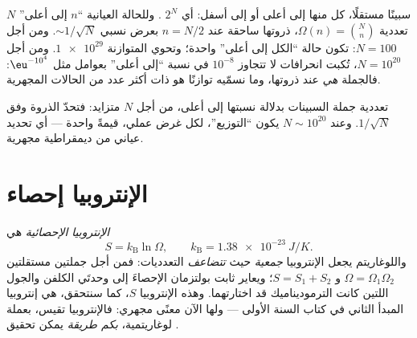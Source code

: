 \begin{example}\label{ex:b3:microcanonical-ensemble:spins}
$N$ سبينًا مستقلًا، كل منها إلى أعلى أو إلى أسفل: أي $2^N$ .
وللحالة العيانية ``$n$ إلى أعلى'' تعددية $\Omega(n) = \binom Nn$،
ذروتها ساحقة عند $n = N/2$ بعرض نسبي
$\sim1/\sqrt N$. ومن أجل $N = 100$: تكون حالة ``الكل إلى أعلى'' واحدة؛ وتحوي
 المتوازنة $\num{1e29}$. ومن أجل $N = 10^{20}$،
تُكبت انحرافات لا تتجاوز $10^{-8}$ في نسبة ``إلى أعلى'' بعوامل
مثل $\eu^{-10^4}$: فالجملة \emph{هي} عند ذروتها، وما نسمّيه
توازنًا هو  ذات أكثر عدد من الحالات
المجهرية.
\end{example}

\begin{omfigure}

{\small تعددية جملة السبينات بدلالة نسبتها إلى أعلى،
من أجل $N$ متزايد: فتحدّ الذروة وفق $1/\sqrt N$. وعند $N \sim
10^{20}$ يكون ``التوزيع''، لكل غرض عملي،
قيمةً واحدة --- أي تحديد عياني من ديمقراطية
مجهرية.}
\end{omfigure}

\section{الإنتروبيا إحصاء}

\begin{definition}\label{def:b3:microcanonical-ensemble:entropy}
\emph{الإنتروبيا الإحصائية}  هي
\[
S = k_{\text{B}}\ln\Omega , \qquad
k_{\text{B}} = \qty{1.38e-23}{J/K} .
\]
واللوغاريتم يجعل الإنتروبيا \emph{جمعية} حيث \emph{تتضاعف}
التعدديات: فمن أجل جملتين مستقلتين $\Omega = \Omega_1\Omega_2$
و $S = S_1 + S_2$؛ ويعاير ثابت بولتزمان الإحصاءَ إلى
وحدتَي الكلفن والجول اللتين كانت الترموديناميك قد اختارتهما. وهذه
الإنتروبيا $S$، كما سنتحقق، هي إنتروبيا المبدأ الثاني في كتاب السنة
الأولى --- ولها الآن معنًى مجهري: فالإنتروبيا تقيس، بعملة
لوغاريتمية، \emph{بكم طريقة} يمكن تحقيق .
\end{definition}


